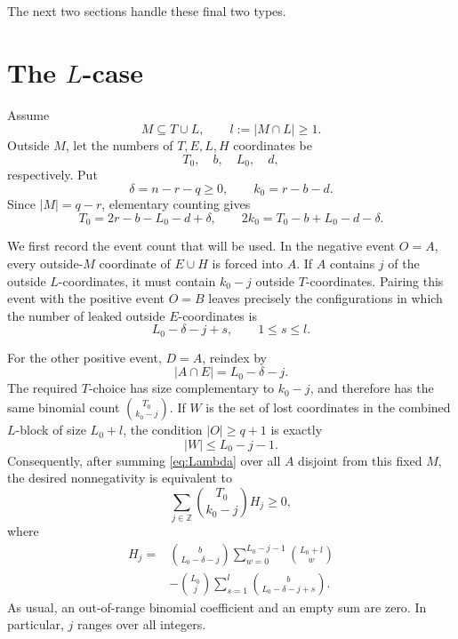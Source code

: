 \documentclass[11pt]{article}
\newcommand{\1}{\mathbf 1}
\begin{document}
The next two sections handle these final two types.

\section{The $L$-case}

Assume
\[
M\subseteq T\cup L,
\qquad
l:=|M\cap L|\geq1.
\]
Outside $M$, let the numbers of $T,E,L,H$ coordinates be
\[
T_0,\quad b,\quad L_0,\quad d,
\]
respectively.  Put
\[
\delta=n-r-q\geq0,
\qquad
k_0=r-b-d.
\]
Since $|M|=q-r$, elementary counting gives
\begin{equation}\label{eq:L-identities}
T_0=2r-b-L_0-d+\delta,
\qquad
2k_0=T_0-b+L_0-d-\delta.
\end{equation}

We first record the event count that will be used.  In the negative
event $O=A$, every outside-$M$ coordinate of $E\cup H$ is forced into
$A$.  If $A$ contains $j$ of the outside $L$-coordinates, it must
contain $k_0-j$ outside $T$-coordinates.  Pairing this event with the
positive event $O=B$ leaves precisely the configurations in which the
number of leaked outside $E$-coordinates is
\[
L_0-\delta-j+s,
\qquad
1\leq s\leq l.
\]

For the other positive event, $D=A$, reindex by
\[
|A\cap E|=L_0-\delta-j.
\]
The required $T$-choice has size complementary to $k_0-j$, and
therefore has the same binomial count $\binom{T_0}{k_0-j}$.  If $W$ is
the set of lost coordinates in the combined $L$-block of size
$L_0+l$, the condition $|O|\geq q+1$ is exactly
\[
|W|\leq L_0-j-1.
\]
Consequently, after summing \eqref{eq:Lambda} over all $A$ disjoint
from this fixed $M$, the desired nonnegativity is equivalent to
\begin{equation}\label{eq:L-sum}
\sum_{j\in\mathbb Z}\binom{T_0}{k_0-j}H_j\geq0,
\end{equation}
where
\begin{equation}\label{eq:def-Hj}
\begin{aligned}
H_j={}&
\binom b{L_0-\delta-j}
\sum_{w=0}^{L_0-j-1}\binom{L_0+l}{w}\\
&-\binom{L_0}j
\sum_{s=1}^{l}\binom b{L_0-\delta-j+s}.
\end{aligned}
\end{equation}
As usual, an out-of-range binomial coefficient and an empty sum are
zero.  In particular, $j$ ranges over all integers.
\end{document}
